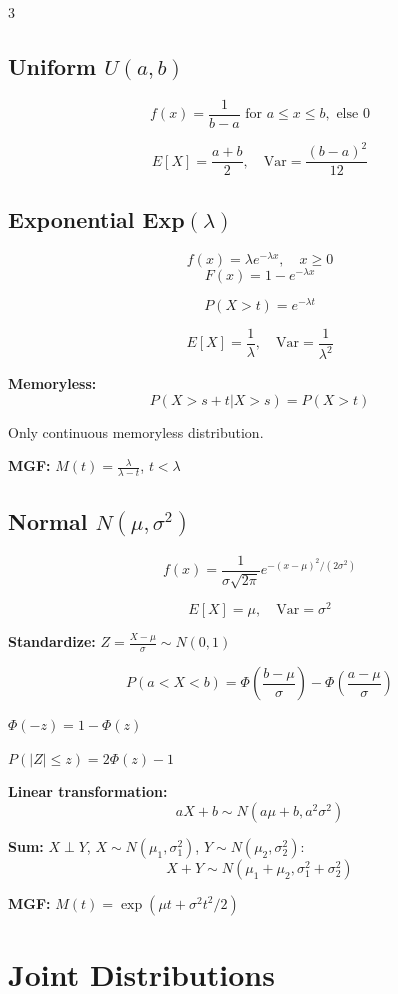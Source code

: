 \documentclass[10pt,landscape]{article}
\begin{document}
\begin{multicols}{3}
\subsection{Uniform $U(a, b)$}
$$f(x) = \frac{1}{b - a} \text{ for } a \leq x \leq b, \text{ else } 0$$

$$E[X] = \frac{a + b}{2}, \quad \text{Var} = \frac{(b - a)^2}{12}$$

\subsection{Exponential Exp$(\lambda)$}
$$f(x) = \lambda e^{-\lambda x}, \quad x \geq 0$$
$$F(x) = 1 - e^{-\lambda x}$$

$$P(X > t) = e^{-\lambda t}$$

$$E[X] = \frac{1}{\lambda}, \quad \text{Var} = \frac{1}{\lambda^2}$$

\textbf{Memoryless:}
$$P(X > s + t | X > s) = P(X > t)$$

Only continuous memoryless distribution.

\textbf{MGF:} $M(t) = \frac{\lambda}{\lambda - t}$, $t < \lambda$

\subsection{Normal $N(\mu, \sigma^2)$}
$$f(x) = \frac{1}{\sigma\sqrt{2\pi}} e^{-(x - \mu)^2/(2\sigma^2)}$$

$$E[X] = \mu, \quad \text{Var} = \sigma^2$$

\textbf{Standardize:} $Z = \frac{X - \mu}{\sigma} \sim N(0, 1)$

$$P(a < X < b) = \Phi\left(\frac{b - \mu}{\sigma}\right) - \Phi\left(\frac{a - \mu}{\sigma}\right)$$

$\Phi(-z) = 1 - \Phi(z)$

$P(|Z| \leq z) = 2\Phi(z) - 1$

\textbf{Linear transformation:}
$$aX + b \sim N(a\mu + b, a^2\sigma^2)$$

\textbf{Sum:} $X \perp Y$, $X \sim N(\mu_1, \sigma_1^2)$, $Y \sim N(\mu_2, \sigma_2^2)$:
$$X + Y \sim N(\mu_1 + \mu_2, \sigma_1^2 + \sigma_2^2)$$

\textbf{MGF:} $M(t) = \exp(\mu t + \sigma^2 t^2 / 2)$

\section{Joint Distributions}


\end{multicols}
\end{document}
